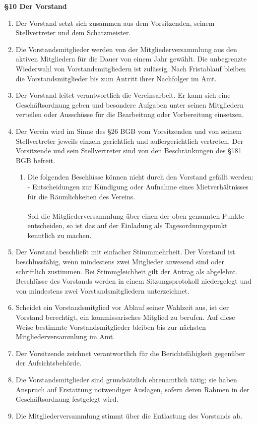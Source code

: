 \documentclass[a4paper,
               12pt,
               titlepage,
               parskip=half]{scrartcl}
\begin{document}
\textbf{§10 Der Vorstand}
{\small
	\begin{enumerate}
		\item Der Vorstand setzt sich zusammen aus dem Vorsitzenden, seinem Stellvertreter und dem Schatzmeister.
		\item Die Vorstandsmitglieder werden von der Mitgliederversammlung aus den aktiven Mitgliedern für die Dauer von einem Jahr gewählt. Die unbegrenzte Wiederwahl von Vorstandsmitgliedern ist zulässig. Nach Fristablauf bleiben die Vorstandsmitglieder bis zum Antritt ihrer Nachfolger im Amt.
		\item Der Vorstand leitet verantwortlich die Vereinsarbeit. Er kann sich eine Geschäftsordnung geben und besondere Aufgaben unter seinen Mitgliedern verteilen oder Ausschüsse für die Bearbeitung oder Vorbereitung einsetzen.
		\item Der Verein wird im Sinne des §26 BGB vom Vorsitzenden und von seinem Stellvertreter jeweils einzeln gerichtlich und außergerichtlich vertreten. Der Vorsitzende und sein Stellvertreter sind von den Beschränkungen des §181 BGB befreit.
		\begin{enumerate}[label=\arabic{enumi}\alph*.,leftmargin=0.0in]
			\item Die folgenden Beschlüsse können nicht durch den Vorstand gefällt werden:\\
			- Entscheidungen zur Kündigung oder Aufnahme eines Mietverhältnisses für die Räumlichkeiten des Vereins.\\\\
			Soll die Mitgliederversammlung über einen der oben genannten Punkte entscheiden, so
			ist das auf der Einladung als Tagesordnungspunkt kenntlich zu machen.
	    \end{enumerate}
    	\item Der Vorstand beschließt mit einfacher Stimmmehrheit. Der Vorstand ist beschlussfähig, wenn mindestens zwei Mitglieder anwesend sind oder schriftlich zustimmen. Bei Stimmgleichheit gilt der Antrag als abgelehnt. Beschlüsse des Vorstands werden in einem Sitzungsprotokoll niedergelegt und von mindestens zwei Vorstandsmitgliedern unterzeichnet.
    	\item Scheidet ein Vorstandsmitglied vor Ablauf seiner Wahlzeit aus, ist der Vorstand berechtigt, ein kommissarisches Mitglied zu berufen. Auf diese Weise bestimmte Vorstandsmitglieder bleiben bis zur nächsten Mitgliederversammlung im Amt.
    	\item Der Vorsitzende zeichnet verantwortlich für die Berichtsfähigkeit gegenüber der Aufsichtsbehörde.
    	\item Die Vorstandsmitglieder sind grundsätzlich ehrenamtlich tätig; sie haben Anspruch auf Erstattung notwendiger Auslagen, sofern deren Rahmen in der Geschäftsordnung festgelegt wird.
    	\item Die Mitgliederversammlung stimmt über die Entlastung des Vorstands ab.
	\end{enumerate}
}
\end{document}
